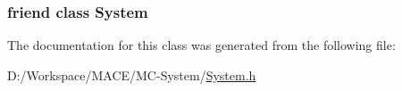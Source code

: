 \subsubsection[{\texorpdfstring{System}{System}}]{\setlength{\rightskip}{0pt plus 5cm}friend class {\bf System}\hspace{0.3cm}{\ttfamily [friend]}}\hypertarget{classmc_1_1_module_af18a9ee98e70982bfe2975391d7221a5}{}\label{classmc_1_1_module_af18a9ee98e70982bfe2975391d7221a5}


The documentation for this class was generated from the following file\+:\begin{DoxyCompactItemize}
\item 
D\+:/\+Workspace/\+M\+A\+C\+E/\+M\+C-\/\+System/\hyperlink{_system_8h}{System.\+h}\end{DoxyCompactItemize}
